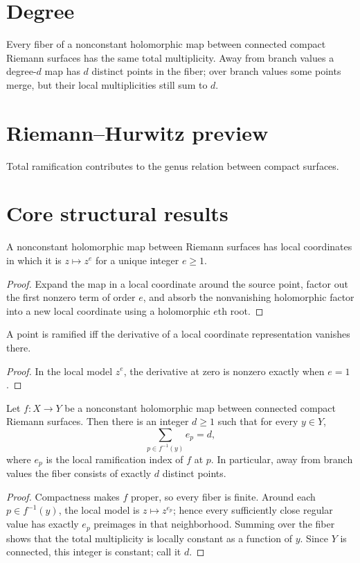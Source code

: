 \section{Degree}
Every fiber of a nonconstant holomorphic map between connected compact Riemann surfaces has the same total multiplicity. Away from branch values a degree-$d$ map has $d$ distinct points in the fiber; over branch values some points merge, but their local multiplicities still sum to $d$.

\section{Riemann--Hurwitz preview}
Total ramification contributes to the genus relation between compact surfaces.

\section{Core structural results}

\begin{theorem}\label{thm:iv24-01}
A nonconstant holomorphic map between Riemann surfaces has local coordinates in which it is $z\mapsto z^e$ for a unique integer $e\ge1$.
\begin{proof}
Expand the map in a local coordinate around the source point, factor out the first nonzero term of order $e$, and absorb the nonvanishing holomorphic factor into a new local coordinate using a holomorphic $e$th root.
\end{proof}
\end{theorem}

\begin{theorem}\label{thm:iv24-02}
A point is ramified iff the derivative of a local coordinate representation vanishes there.
\begin{proof}
In the local model $z^e$, the derivative at zero is nonzero exactly when $e=1$.
\end{proof}
\end{theorem}

\begin{theorem}\label{thm:iv24-03}
Let $f:X\to Y$ be a nonconstant holomorphic map between connected compact Riemann surfaces. Then there is an integer $d\ge1$ such that for every $y\in Y$,
\[
\sum_{p\in f^{-1}(y)} e_p=d,
\]
where $e_p$ is the local ramification index of $f$ at $p$. In particular, away from branch values the fiber consists of exactly $d$ distinct points.
\begin{proof}
Compactness makes $f$ proper, so every fiber is finite. Around each $p\in f^{-1}(y)$, the local model is $z\mapsto z^{e_p}$; hence every sufficiently close regular value has exactly $e_p$ preimages in that neighborhood. Summing over the fiber shows that the total multiplicity is locally constant as a function of $y$. Since $Y$ is connected, this integer is constant; call it $d$.
\end{proof}
\end{theorem}

